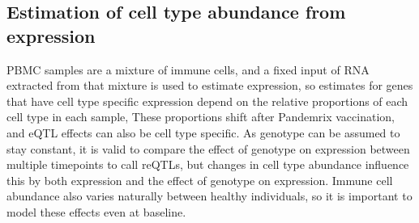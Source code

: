 \subsection{Estimation of cell type abundance from expression}
\label{subsec:hird_reQTL_xCell}



%
\Gls{PBMC} samples are a mixture of immune cells, and a fixed input of RNA extracted from that mixture is used to estimate expression, 
so estimates for genes that have cell type specific expression depend on the relative proportions of each cell type in each sample, 
These proportions shift after Pandemrix vaccination\autocite{sobolev2016AdjuvantedInfluenzaH1N1Vaccination},
and \gls{eQTL} effects can also be cell type specific.
As genotype can be assumed to stay constant, it is valid to compare the effect of genotype on expression between multiple timepoints to call \glspl{reQTL}, 
but changes in cell type abundance influence this by  both expression and the effect of genotype on expression.
Immune cell abundance also varies naturally between healthy individuals\autocite{brodin2015VariationHumanImmune,brodin2017HumanImmuneSystem}, so it is important to model these effects even at baseline.

